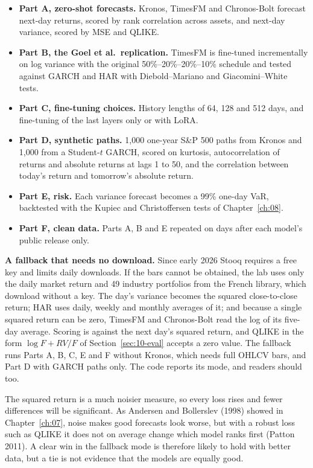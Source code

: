 \begin{itemize}
  \item \textbf{Part A, zero-shot forecasts.} Kronos, TimesFM and Chronos-Bolt forecast next-day returns, scored by rank correlation across assets, and next-day variance, scored by MSE and QLIKE.
  \item \textbf{Part B, the Goel et al.\ replication.} TimesFM is fine-tuned incrementally on log variance with the original 50\%--20\%--20\%--10\% schedule and tested against GARCH and HAR with Diebold--Mariano and Giacomini--White tests.
  \item \textbf{Part C, fine-tuning choices.} History lengths of 64, 128 and 512 days, and fine-tuning of the last layers only or with LoRA.
  \item \textbf{Part D, synthetic paths.} 1,000 one-year S\&P 500 paths from Kronos and 1,000 from a Student-$t$ GARCH, scored on kurtosis, autocorrelation of returns and absolute returns at lags 1 to 50, and the correlation between today's return and tomorrow's absolute return.
  \item \textbf{Part E, risk.} Each variance forecast becomes a 99\% one-day VaR, backtested with the Kupiec and Christoffersen tests of Chapter~\ref{ch:08}.
  \item \textbf{Part F, clean data.} Parts A, B and E repeated on days after each model's public release only.
\end{itemize}

\textbf{A fallback that needs no download.} Since early 2026 Stooq requires a free key and limits daily downloads. If the bars cannot be obtained, the lab uses only the daily market return and 49 industry portfolios from the French library, which download without a key. The day's variance becomes the squared close-to-close return; HAR uses daily, weekly and monthly averages of it; and because a single squared return can be zero, TimesFM and Chronos-Bolt read the log of its five-day average. Scoring is against the next day's squared return, and QLIKE in the form $\log F + RV/F$ of Section~\ref{sec:10-eval} accepts a zero value. The fallback runs Parts A, B, C, E and F without Kronos, which needs full OHLCV bars, and Part D with GARCH paths only. The code reports its mode, and readers should too.

The squared return is a much noisier measure, so every loss rises and fewer differences will be significant. As Andersen and Bollerslev (1998) showed in Chapter~\ref{ch:07}, noise makes good forecasts look worse, but with a robust loss such as QLIKE it does not on average change which model ranks first (Patton 2011). A clear win in the fallback mode is therefore likely to hold with better data, but a tie is not evidence that the models are equally good.

